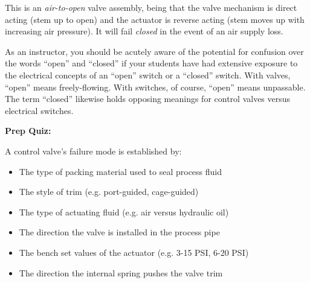 This is an {\it air-to-open} valve assembly, being that the valve mechanism is direct acting (stem up to open) and the actuator is reverse acting (stem moves up with increasing air pressure).  It will fail {\it closed} in the event of an air supply loss.

\vskip 10pt

As an instructor, you should be acutely aware of the potential for confusion over the words ``open'' and ``closed'' if your students have had extensive exposure to the electrical concepts of an ``open'' switch or a ``closed'' switch.  With valves, ``open'' means freely-flowing.  With switches, of course, ``open'' means unpassable.  The term ``closed'' likewise holds opposing meanings for control valves versus electrical switches.

\vfil \eject

\noindent
{\bf Prep Quiz:}

A control valve's failure mode is established by:

\begin{itemize}
\item{} The type of packing material used to seal process fluid
\vskip 5pt 
\item{} The style of trim (e.g. port-guided, cage-guided)
\vskip 5pt 
\item{} The type of actuating fluid (e.g. air versus hydraulic oil)
\vskip 5pt 
\item{} The direction the valve is installed in the process pipe
\vskip 5pt 
\item{} The bench set values of the actuator (e.g. 3-15 PSI, 6-20 PSI)
\vskip 5pt 
\item{} The direction the internal spring pushes the valve trim
\end{itemize}






